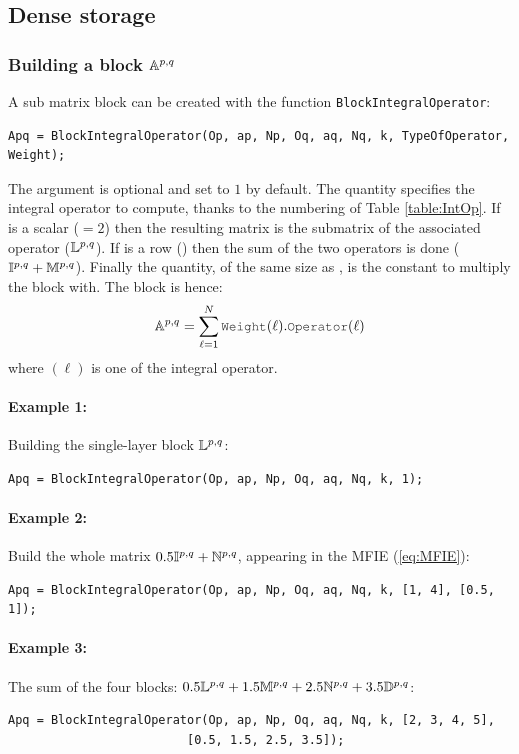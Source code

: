 \subsection{Dense storage}
\subsubsection{Building a block $\mathbb{A}^{p,q}$}

A sub matrix block can be created with the function \texttt{BlockIntegralOperator}:
\begin{lstlisting}
Apq = BlockIntegralOperator(Op, ap, Np, Oq, aq, Nq, k, TypeOfOperator, Weight);
\end{lstlisting}
The  argument is optional and set to $1$ by default. The quantity  specifies the integral operator to compute, thanks to the numbering of Table \ref{table:IntOp}. If  is a scalar (\eg $=2$) then the resulting matrix  is the submatrix of the associated operator (\eg $\mathbb{L}^{p,q}$). If  is a row (\eg \code{[1,3]}) then the sum of the two operators is done (\eg $\mathbb{I}^{p,q}+\mathbb{M}^{p,q}$). Finally the  quantity, of the same size as , is the constant to multiply the block with. The block is hence:
$$
\Abpq = \sum_{\ell=1}^{N}\code{Weight}(\ell).\code{Operator}(\ell)
$$
where $(\ell)$ is one of the integral operator.

\paragraph{Example 1:} Building the single-layer block $\mathbb{L}^{p,q}$:
\begin{lstlisting}
Apq = BlockIntegralOperator(Op, ap, Np, Oq, aq, Nq, k, 1);
\end{lstlisting}
\paragraph{Example 2:} Build the whole matrix $0.5\mathbb{I}^{p,q} + \mathbb{N}^{p,q}$, appearing in the MFIE (\ref{eq:MFIE}):
\begin{lstlisting}
Apq = BlockIntegralOperator(Op, ap, Np, Oq, aq, Nq, k, [1, 4], [0.5, 1]);
\end{lstlisting}
\paragraph{Example 3:} The sum of the four blocks: $0.5\mathbb{L}^{p,q} + 1.5\mathbb{M}^{p,q} + 2.5\mathbb{N}^{p,q} + 3.5\mathbb{D}^{p,q}$:
\begin{lstlisting}
Apq = BlockIntegralOperator(Op, ap, Np, Oq, aq, Nq, k, [2, 3, 4, 5], 
                         [0.5, 1.5, 2.5, 3.5]);
\end{lstlisting}


